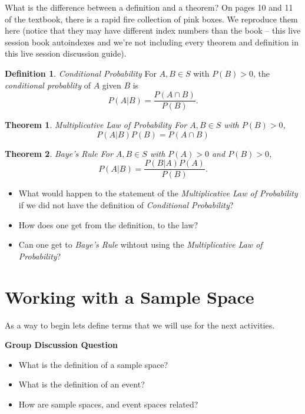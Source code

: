 \documentclass[
]{book}
\providecommand{\tightlist}{%
  \setlength{\itemsep}{0pt}\setlength{\parskip}{0pt}}
\newtheorem{theorem}{Theorem}[chapter]
\theoremstyle{definition}
\newtheorem{definition}{Definition}[chapter]
\theoremstyle{definition}
\theoremstyle{definition}
\theoremstyle{definition}
\theoremstyle{remark}
\begin{document}
What is the difference between a definition and a theorem? On pages 10 and 11 of the textbook, there is a rapid fire collection of pink boxes. We reproduce them here (notice that they may have different index numbers than the book -- this live session book autoindexes and we're not including every theorem and definition in this live session discussion guide).

\begin{definition}
\emph{Conditional Probability} For \(A, B \in S\) with \(P(B) > 0\), the \emph{conditional probablity} of \(A\) given \(B\) is \[P(A|B) = \frac{P(A\cap B)}{P(B)}.\]
\end{definition}

\begin{theorem}
\emph{Multiplicative Law of Probability} For \(A, B \in S\) with \(P(B) > 0\), \[P(A|B)P(B) = P(A \cap B)\]
\end{theorem}

\begin{theorem}
\emph{Baye's Rule} For \(A, B \in S\) with \(P(A) > 0\) and \(P(B) > 0\), \[P(A|B) = \frac{P(B|A)P(A)}{P(B)}.\]
\end{theorem}

\begin{discussion-question}

\begin{itemize}
\tightlist
\item
  What would happen to the statement of the \emph{Multiplicative Law of Probability} if we did not have the definition of \emph{Conditional Probability}?
\item
  How does one get from the definition, to the law?
\item
  Can one get to \emph{Baye's Rule} wihtout using the \emph{Multiplicative Law of Probability}?
\end{itemize}

\end{discussion-question}

\hypertarget{working-with-a-sample-space}{%
\section{Working with a Sample Space}\label{working-with-a-sample-space}}

As a way to begin lets define terms that we will use for the next activities.

\begin{discussion-question}

\textbf{Group Discussion Question}

\begin{itemize}
\tightlist
\item
  What is the definition of a sample space?
\item
  What is the definition of an event?
\item
  How are sample spaces, and event spaces related?
\end{itemize}

\end{discussion-question}
\end{document}
